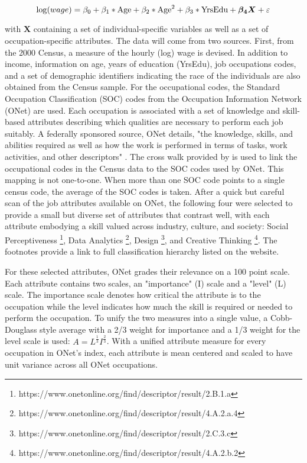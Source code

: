\documentclass[12pt]{article}
\begin{document}
\begin{equation} \label{eq:mincer_equ}
  \log (wage) = \beta_{0} + \beta_{1} * \textnormal{Age} + \beta_{2} * \textnormal{Age}^{2} + \beta_{3} * \textnormal{YrsEdu} + \boldsymbol{\beta_{4}}\boldsymbol{X} + \varepsilon
\end{equation}

with $\boldsymbol{X}$ containing a set of individual-specific 
variables as well as a set of occupation-specific attributes. 
The data will come from two sources. First, from the 2000 Census,
a measure of the hourly (log) wage is devised. In addition to income,
information on age, years of education (YrsEdu), job occupations codes, 
and a set of demographic identifiers indicating the race of the
individuals are also obtained from the Census sample. For the occupational codes,
the Standard Occupation Classification (SOC) codes from the
Occupation Information Network (ONet) are used. Each occupation is
associated with a set of knowledge and skill-based
attributes describing which qualities are necessary to perform each
job suitably. A federally sponsored source, ONet details, "the knowledge,
skills, and abilities required as well as how the work is
performed in terms of tasks, work activities, and other descriptors"
\citep{ONET}. The cross walk provided by \citet{Crosswalk} is used to
link the occupational codes in the Census data to the SOC codes used
by ONet. This mapping is not one-to-one. When more than one SOC code
points to a single census code, the average of the SOC codes is taken.
After a quick but careful scan of the job attributes
available on ONet, the following four were selected to provide
a small but diverse set of attributes that contrast well, with each attribute
embodying a skill valued across industry, culture, and society:
Social Perceptiveness \footnote{https://www.onetonline.org/find/descriptor/result/2.B.1.a},
Data Analytics \footnote{https://www.onetonline.org/find/descriptor/result/4.A.2.a.4},
Design \footnote{https://www.onetonline.org/find/descriptor/result/2.C.3.c},
and Creative Thinking \footnote{https://www.onetonline.org/find/descriptor/result/4.A.2.b.2}.
The footnotes provide a link to  full classification hierarchy listed on the website. 

\bigskip

For these selected attributes, ONet grades their relevance on a
100 point scale. Each attribute contains two scales, an "importance" (I)
scale and a "level" (L) scale. The importance scale denotes how critical the
attribute is to the occupation while the level indicates how much the
skill is required or needed to perform the occupation. To unify the two
measures into a single value, a Cobb-Douglass style average with a
2/3 weight for importance and a 1/3 weight for the level scale is used:
$A = L^{\frac{1}{3}} I^{\frac{2}{3}}$. With a unified attribute measure
for every occupation in ONet's index, each attribute is mean centered and
scaled to have unit variance across all ONet occupations.
\end{document}
